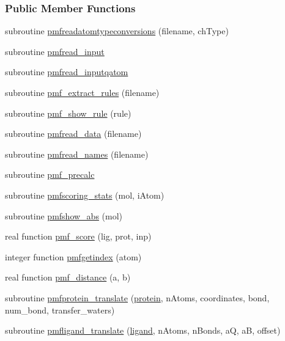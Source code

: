 \subsubsection*{Public Member Functions}
\begin{DoxyCompactItemize}
\item 
subroutine \hyperlink{classcalc__pmf_ab388d577f0dbb88865c1c9d4366e45be}{pmfreadatomtypeconversions} (filename, ch\-Type)
\item 
subroutine \hyperlink{classcalc__pmf_ac3e289539ea4c4398e8c4a01ba575b10}{pmfread\-\_\-input}
\item 
subroutine \hyperlink{classcalc__pmf_a90196b4a510babf40a19b3778cca8b10}{pmfread\-\_\-inputqatom}
\item 
subroutine \hyperlink{classcalc__pmf_ab9ddf3abf49e6eae6d35801de0fea173}{pmf\-\_\-extract\-\_\-rules} (filename)
\item 
subroutine \hyperlink{classcalc__pmf_a65ace29811426cb20f99d06041a8183f}{pmf\-\_\-show\-\_\-rule} (rule)
\item 
subroutine \hyperlink{classcalc__pmf_a0ff94f92c888cfa789cc3c62b19e90df}{pmfread\-\_\-data} (filename)
\item 
subroutine \hyperlink{classcalc__pmf_aad022993ab21419258605190c44313c7}{pmfread\-\_\-names} (filename)
\item 
subroutine \hyperlink{classcalc__pmf_a15f551fc2681bc20e67c32c26f0e6213}{pmf\-\_\-precalc}
\item 
subroutine \hyperlink{classcalc__pmf_a638031979f9e34f663de98290b3203bf}{pmfscoring\-\_\-stats} (mol, i\-Atom)
\item 
subroutine \hyperlink{classcalc__pmf_aad41bacd5a05bb356118391b53099785}{pmfshow\-\_\-abs} (mol)
\item 
real function \hyperlink{classcalc__pmf_a2ce532c8dbd81ccb5221196f08dc3a4c}{pmf\-\_\-score} (lig, prot, inp)
\item 
integer function \hyperlink{classcalc__pmf_adb092d3fa3d597aa80099dac1ff51d24}{pmfgetindex} (atom)
\item 
real function \hyperlink{classcalc__pmf_ae502584ca9d4449aef004eab08ac0201}{pmf\-\_\-distance} (a, b)
\item 
subroutine \hyperlink{classcalc__pmf_a2baa30c7de82768257cedb4c5062089b}{pmfprotein\-\_\-translate} (\hyperlink{classcalc__pmf_aafcf4af6240191b24adac7de7d51fa0d}{protein}, n\-Atoms, coordinates, bond, num\-\_\-bond, transfer\-\_\-waters)
\item 
subroutine \hyperlink{classcalc__pmf_a6b259a5b36a4ab2d3c86400f88d2e60c}{pmfligand\-\_\-translate} (\hyperlink{classcalc__pmf_adb3a353d55dd9c86c7a56dfec5bfef05}{ligand}, n\-Atoms, n\-Bonds, a\-Q, a\-B, offset)

\end{DoxyCompactItemize}
